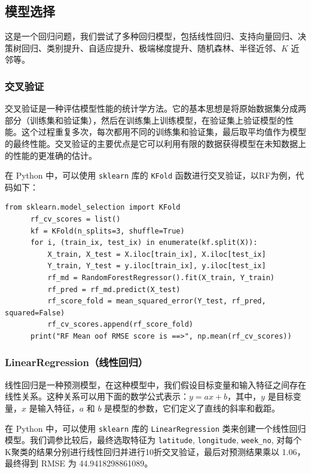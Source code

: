 \documentclass{ctexart}
\begin{document}
\begin{sloppypar}
\subsection{模型选择}

这是一个回归问题，我们尝试了多种回归模型，包括线性回归、支持向量回归、决策树回归、类别提升、自适应提升、极端梯度提升、随机森林、半径近邻、$K$ 近邻等。

\subsubsection{交叉验证}

交叉验证是一种评估模型性能的统计学方法。它的基本思想是将原始数据集分成两部分（训练集和验证集），然后在训练集上训练模型，在验证集上验证模型的性能。这个过程重复多次，每次都用不同的训练集和验证集，最后取平均值作为模型的最终性能。交叉验证的主要优点是它可以利用有限的数据获得模型在未知数据上的性能的更准确的估计。

在 Python 中，可以使用 \texttt{sklearn} 库的 \texttt{KFold} 函数进行交叉验证，以RF为例，代码如下：

\begin{lstlisting}[style=Python]
      from sklearn.model_selection import KFold
      rf_cv_scores = list()
      kf = KFold(n_splits=3, shuffle=True)
      for i, (train_ix, test_ix) in enumerate(kf.split(X)):
          X_train, X_test = X.iloc[train_ix], X.iloc[test_ix]
          Y_train, Y_test = y.iloc[train_ix], y.iloc[test_ix]
          rf_md = RandomForestRegressor().fit(X_train, Y_train)
          rf_pred = rf_md.predict(X_test)
          rf_score_fold = mean_squared_error(Y_test, rf_pred, squared=False)
          rf_cv_scores.append(rf_score_fold)
      print("RF Mean oof RMSE score is ==>", np.mean(rf_cv_scores))
\end{lstlisting}

\subsubsection{LinearRegression（线性回归）}

线性回归是一种预测模型，在这种模型中，我们假设目标变量和输入特征之间存在线性关系。这种关系可以用下面的数学公式表示：$y = a x + b$，其中，$y$ 是目标变量，$x$ 是输入特征，$a$ 和 $b$ 是模型的参数，它们定义了直线的斜率和截距。

在 Python 中，可以使用 \texttt{sklearn} 库的 \texttt{LinearRegression} 类来创建一个线性回归模型。我们调参比较后，最终选取特征为 \texttt{latitude}, \texttt{longitude}, \texttt{week\_no}, 对每个K聚类的结果分别进行线性回归并进行10折交叉验证，最后对预测结果乘以 1.06，最终得到 RMSE 为 44.9418298861089。


\end{sloppypar}
\end{document}
